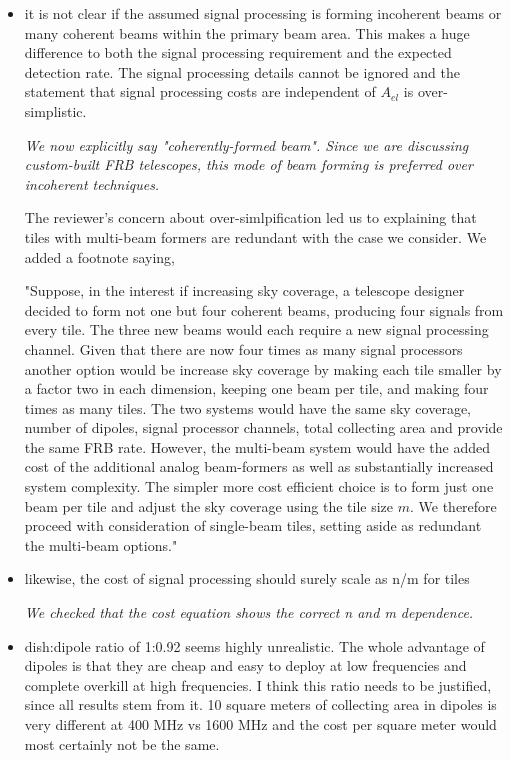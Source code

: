 \documentclass{article}
\begin{document}
\begin{itemize}
    \item it is not clear if the assumed signal processing is forming incoherent beams or many coherent beams within the primary beam area. This makes a huge difference to both the signal processing requirement and the expected detection rate. The signal processing details cannot be ignored and the statement that signal processing costs are independent of $A_{el}$ is over-simplistic.
{\it We now explicitly say "coherently-formed beam". Since we are discussing custom-built FRB telescopes, this mode of beam forming is preferred over incoherent techniques.  

The reviewer's concern about over-simlpification led us to explaining that tiles with multi-beam formers are redundant with the case we consider. We added a footnote saying,

"Suppose, in the interest if increasing sky coverage, a telescope designer decided to form not one but four coherent beams, producing four signals from every tile. The three new beams would each require a new signal processing channel. Given that there are now four times as many signal processors another option would be increase sky coverage by making each tile smaller by a factor two in each dimension, keeping one beam per tile, and making four times as many tiles.  The two systems would have the same sky coverage, number of dipoles, signal processor channels, total collecting area and provide the same FRB rate. However, the multi-beam system would have the added cost of the additional analog beam-formers as well as substantially increased system complexity. The simpler more cost efficient choice is to form just one beam per tile and adjust the sky coverage using the tile size $m$. We therefore proceed with consideration of single-beam tiles, setting aside as redundant the multi-beam options."}

    \item likewise, the cost of signal processing should surely scale as n/m for tiles  
    
{\it We checked that the cost equation shows the correct n and m dependence.}
    
    \item dish:dipole ratio of 1:0.92 seems highly unrealistic. The whole advantage of dipoles is that they are cheap and easy to deploy at low frequencies and complete overkill at high frequencies. I think this ratio needs to be justified, since all results stem from it. 10 square meters of collecting area in dipoles is very different at 400 MHz vs 1600 MHz and the cost per square meter would most certainly not be the same.
    

\end{itemize}
\end{document}

